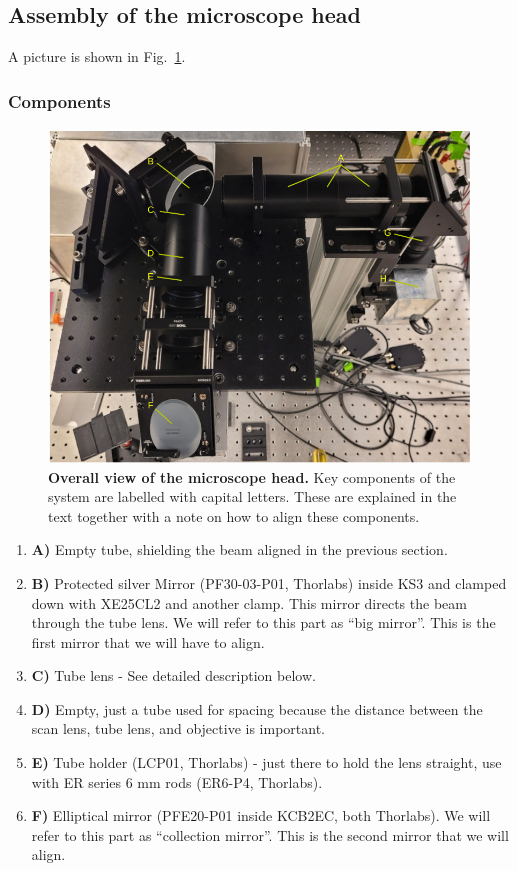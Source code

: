 \documentclass[10pt,letterpaper]{article}
\begin{document}
\subsection{Assembly of the microscope head}
%
A picture is shown in Fig.~\ref{sfig5}.
\subsubsection{Components}
%
\begin{figure}[t!]
    \includegraphics[width=\textwidth]{sfig5.jpg}
    \caption{{\bf Overall view of the microscope head.} Key components of the system are labelled with capital letters. These are explained in the text together with a note on how to align these components.}
    \label{sfig5}
\end{figure}
%
\begin{enumerate}[]
    \item \textbf{A)} Empty tube, shielding the beam aligned in the previous section.
    \item \textbf{B)} Protected silver Mirror (PF30-03-P01, Thorlabs) inside KS3 and clamped down with XE25CL2 and another clamp. This mirror directs the beam through the tube lens. We will refer to this part as ``big mirror''. This is the first mirror that we will have to align.
    \item \textbf{C)} Tube lens - See detailed description below.
    \item \textbf{D)} Empty, just a tube used for spacing because the distance between the scan lens, tube lens, and objective is important.
    \item \textbf{E)} Tube holder (LCP01, Thorlabs) - just there to hold the lens straight, use with ER series 6 mm rods (ER6-P4, Thorlabs).
    \item \textbf{F)} Elliptical mirror (PFE20-P01 inside KCB2EC, both Thorlabs). We will refer to this part as ``collection mirror''. This is the second mirror that we will align.
\end{enumerate}
%
%
\end{document}
